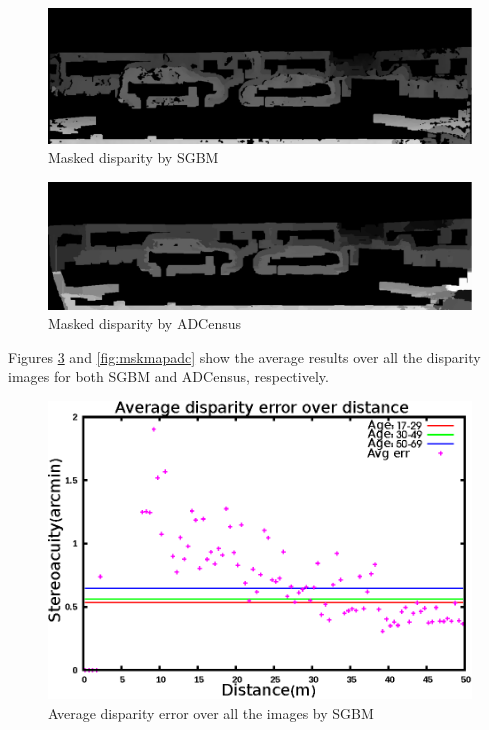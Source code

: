 \begin{figure}[H]
\centering
\includegraphics[scale=0.35]{5mdispsgb}
\caption{Masked disparity by SGBM}
\label{fig:5mdispsgb}
\end{figure} 

\begin{figure}[H]
\centering
\includegraphics[scale=0.35]{5mdispadc}
\caption{Masked disparity by ADCensus}
\label{fig:5mdispadc}
\end{figure} 

\noindent
Figures \ref{fig:mskmapsgbm} and \ref{fig:mskmapadc} show the average results over all the disparity images for both SGBM and ADCensus, respectively.

\begin{figure}[H]
\centering
\includegraphics[scale=0.8]{sgbmmsk1000}
\caption{Average disparity error over all the images by SGBM}
\label{fig:mskmapsgbm}
\end{figure} 

